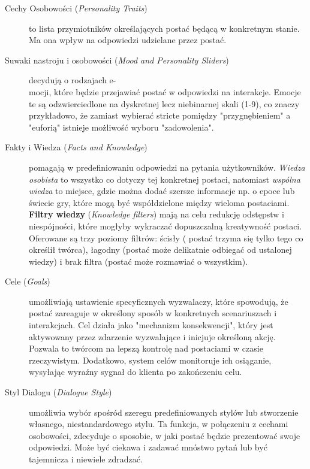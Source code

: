 \begin{description}
    \item[Cechy Osobowości (\textit{Personality Traits})] to lista przymiotników określających postać będącą
          w konkretnym stanie. Ma ona wpływ na odpowiedzi udzielane przez postać\cite{inworld_docs}.

    \item[Suwaki nastroju i osobowości (\textit{Mood and Personality Sliders})] decydują o rodzajach e-\\
          mocji, które będzie przejawiać postać w odpowiedzi na interakcje. Emocje te są odzwierciedlone
          na dyskretnej lecz niebinarnej skali (1-9), co znaczy przykładowo, że zamiast wybierać
          stricte pomiędzy "przygnębieniem" a "euforią" istnieje możliwość wyboru "zadowolenia"\cite{inworld_docs}.

    \item[Fakty i Wiedza (\textit{Facts and Knowledge})] pomagają w predefiniowaniu odpowiedzi na pytania użytkowników.
          \textit{Wiedza osobista} to wszystko co dotyczy tej konkretnej postaci, natomiast \textit{wspólna wiedza} to miejsce, gdzie można
          dodać szersze informacje np. o epoce lub świecie gry, które mogą być współdzielone między wieloma
          postaciami. \textbf{Filtry wiedzy} (\textit{Knowledge filters}) mają na celu redukcję odstępstw i niespójności, które
          mogłyby wykraczać dopuszczalną kreatywność postaci. Oferowane są trzy poziomy filtrów: ścisły (
          postać trzyma się tylko tego co określił twórca), łagodny (postać może delikatnie odbiegać od
          ustalonej wiedzy) i brak filtra (postać może rozmawiać o wszystkim)\cite{inworld_docs}.

    \item[Cele (\textit{Goals})] umożliwiają ustawienie specyficznych wyzwalaczy, które spowodują, że postać
          zareaguje w określony sposób w konkretnych scenariuszach i interakcjach. Cel działa jako "mechanizm
          konsekwencji", który jest aktywowany przez zdarzenie wyzwalające i inicjuje określoną akcję. Pozwala
          to twórcom na lepszą kontrolę nad postaciami w czasie rzeczywistym. Dodatkowo, system celów
          monitoruje ich osiąganie, wysyłając wyraźny sygnał do klienta po zakończeniu celu\cite{inworld_docs}.

    \item[Styl Dialogu (\textit{Dialogue Style})] umożliwia wybór spośród szeregu predefiniowanych stylów lub stworzenie
          własnego, niestandardowego stylu. Ta funkcja, w połączeniu z cechami osobowości, zdecyduje o
          sposobie, w jaki postać będzie prezentować swoje odpowiedzi. Może być ciekawa i zadawać mnóstwo pytań
          lub być tajemnicza i niewiele zdradzać\cite{inworld_docs}.


\end{description}
